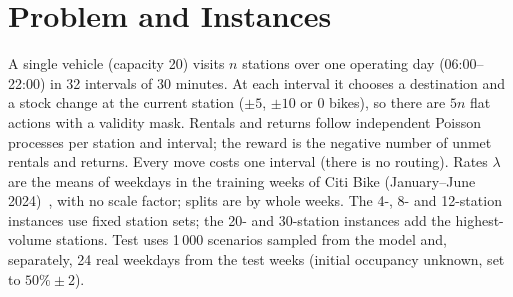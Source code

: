 \documentclass[conference,a4paper]{IEEEtran}
\begin{document}
\section{Problem and Instances}
A single vehicle (capacity 20) visits $n$ stations over one operating day (06:00--22:00) in 32 intervals of 30 minutes. At each interval it chooses a destination and a
stock change at the current station ($\pm 5$, $\pm 10$ or 0 bikes), so there are $5n$ flat actions with a validity mask. Rentals and returns follow independent Poisson
processes per station and interval; the reward is the negative number of unmet rentals and returns. Every move costs one interval (there is no routing).
Rates $\lambda$ are the means of weekdays in the training weeks of Citi Bike (January--June 2024)~\cite{citibike}, with no scale factor; splits are by whole weeks.
The 4-, 8- and 12-station instances use fixed station sets; the 20- and 30-station instances add the highest-volume stations. Test uses 1\,000 scenarios sampled
from the model and, separately, 24 real weekdays from the test weeks (initial occupancy unknown, set to $50\%\pm 2$).
\end{document}
